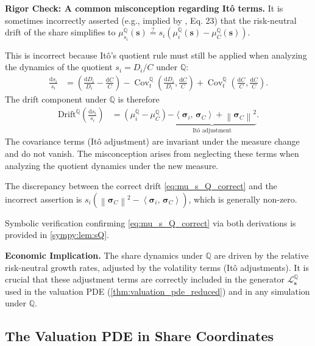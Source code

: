 \documentclass[11pt,letterpaper,oneside]{article}
\numberwithin{equation}{section}
\DeclareMathOperator{\Cov}{\mathrm{Cov}}
\newcommand{\1}{\mathbf{1}}
\newcommand{\diff}{\mathrm{d}}
\newcommand{\norm}[1]{\left\lVert #1\right\rVert}
\newcommand{\ip}[2]{\left\langle #1,\,#2\right\rangle}
\begin{document}
\begin{tcolorbox}[mathstyle]
  	\textbf{Rigor Check: A common misconception regarding It\^o terms.}
  It is sometimes incorrectly asserted (e.g., implied by \cite{cochrane2008}, Eq. 23) that the risk-neutral drift of the share simplifies to $\mu_{s_i}^{\mathbb{Q}}(\bm{s}) \stackrel{?}{=} s_i(\mu_i^{\mathbb{Q}}(\bm{s})-\mu_C^{\mathbb{Q}}(\bm{s}))$.

  This is incorrect because It\^o's quotient rule must still be applied when analyzing the dynamics of the quotient $s_i = D_i/C$ under $\mathbb{Q}$:
  \begin{align}
    \frac{\diff s_i}{s_i} &= \left(\frac{\diff D_i}{D_i} - \frac{\diff C}{C}\right) - \Cov^{\mathbb{Q}}_t\left(\frac{\diff D_i}{D_i}, \frac{\diff C}{C}\right) + \Cov^{\mathbb{Q}}_t\left(\frac{\diff C}{C}, \frac{\diff C}{C}\right).
  \end{align}
  The drift component under $\mathbb{Q}$ is therefore
  \begin{align}
    	\text{Drift}^{\mathbb{Q}}\left(\frac{\diff s_i}{s_i}\right) &= (\mu_i^{\mathbb{Q}} - \mu_C^{\mathbb{Q}}) \underbrace{- \ip{\bm{\sigma}_i}{\bm{\sigma}_C} + \norm{\bm{\sigma}_C}^2}_{\text{It\^o adjustment}}.
  \end{align}
  The covariance terms (It\^o adjustment) are invariant under the measure change and do not vanish. The misconception arises from neglecting these terms when analyzing the quotient dynamics under the new measure.

  The discrepancy between the correct drift \eqref{eq:mu_s_Q_correct} and the incorrect assertion is $s_i (
\norm{\bm{\sigma}_C}^2 - \ip{\bm{\sigma}_i}{\bm{\sigma}_C})$, which is generally non-zero.

Symbolic verification confirming \eqref{eq:mu_s_Q_correct} via both derivations is provided in \cref{sympy:lem:sQ}.

\begin{tcolorbox}[didacticstyle]
  	\textbf{Economic Implication.} The share dynamics under $\mathbb{Q}$ are driven by the relative risk-neutral growth rates, adjusted by the volatility terms (It\^o adjustments). It is crucial that these adjustment terms are correctly included in the generator $\mathcal{L}^{\mathbb{Q}}_{\bm{s}}$ used in the valuation PDE (\cref{thm:valuation_pde_reduced}) and in any simulation under $\mathbb{Q}$.
\end{tcolorbox}
\end{tcolorbox}

\subsection{The Valuation PDE in Share Coordinates}
\end{document}

